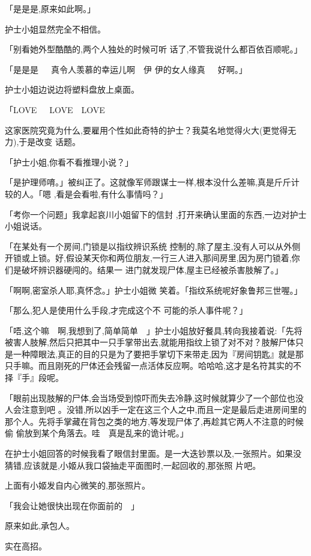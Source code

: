 \documentclass{article}
\begin{document}
「是是是,原来如此啊。」 


护士小姐显然完全不相信。 

「别看她外型酷酷的,两个人独处的时候可听
话了,不管我说什么都百依百顺呢。」 

\newpage

「是是是~~~真令人羡慕的幸运儿啊~~伊
伊的女人缘真~~~好啊。」 


护士小姐边说边将塑料盘放上桌面。 

「LOVE~~~LOVE~~LOVE~~

这家医院究竟为什么,要雇用个性如此奇特的护士？我莫名地觉得火大(更觉得无力),于是改变
话题。 


「护士小姐,你看不看推理小说？」 

「是护理师唷。」被纠正了。这就像军师跟谋士一样,根本没什么差嘛,真是斤斤计较的人。「嗯
,看是会看啦,有什么事情吗？」 

「考你一个问题」我拿起哀川小姐留下的信封
,打开来确认里面的东西,一边对护士小姐说话。 

「在某处有一个房间,门锁是以指纹辨识系统
\newpage
控制的,除了屋主,没有人可以从外侧开锁或上锁。好,假设某天你和两位朋友,一行三人进入那间房里,因为房门锁着,你们是破坏辨识器硬闯的。结果一
进门就发现尸体,屋主已经被杀害肢解了。」 

「啊啊,密室杀人耶,真怀念。」护士小姐微
笑着。「指纹系统呢好象鲁邦三世喔。」 

「那么,犯人是使用什么手段,才完成这个不
可能的杀人事件呢？」 

「唔,这个嘛~~啊,我想到了,简单简单~~」护士小姐放好餐具,转向我接着说:「先将被害人肢解,然后只把其中一只手掌带出去,就能用指纹上锁了对不对？肢解尸体只是一种障眼法,真正的目的只是为了要把手掌切下来带走,因为『房间钥匙』就是那只手嘛。而且刚死的尸体还会残留一点活体反应啊。哈哈哈,这才是名符其实的不择『手』段呢。

「眼前出现肢解的尸体,会当场受到惊吓而失去冷静,这时候就算少了一个部位也没人会注意到吧
\newpage
。没错,所以凶手一定在这三个人之中,而且一定是最后走进房间里的那个人。先将手掌藏在背包之类的地方,等发现尸体了,再趁其它两人不注意的时候偷
偷放到某个角落去。哇~~真是乱来的诡计呢。」 


在护士小姐回答的时候我看了眼信封里面。是一大迭钞票以及,一张照片。如果没猜错,应该就是,小姬从我口袋抽走平面图时,一起回收的,那张照
片吧。 


上面有小姬发自内心微笑的,那张照片。 


「我会让她很快出现在你面前的~~」 


原来如此,承包人。 


实在高招。 
\end{document}

